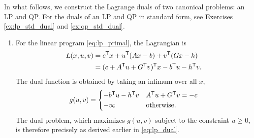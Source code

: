 \begin{Example}
In what follows, we construct the Lagrange duals of two canonical problems: an
LP and QP. For the duals of an LP and QP in standard form, see Exercises
\ref{ex:lp_std_dual} and \ref{ex:qp_std_dual}.           

\begin{enumerate}[label=\alph*., ref=\alph*]  
\item {} 
For the linear program \eqref{eq:lp_primal}, the Lagrangian is
\begin{align*}
L(x,u,v) &= c^{\mathsf{T}} x + u^{\mathsf{T}} (Ax - b) + v^{\mathsf{T}} (Gx - h) \\
&= (c + A^{\mathsf{T}} u + G^{\mathsf{T}} v)^{\mathsf{T}} x - b^{\mathsf{T}} u - h^{\mathsf{T}} v.
\end{align*}
The dual function is obtained by taking an infimum over all $x$,
\[
g(u,v) = \begin{cases}
- b^{\mathsf{T}} u - h^{\mathsf{T}} v & A^{\mathsf{T}} u + G^{\mathsf{T}} v = -c \\
- \infty & \text{otherwise}.
\end{cases}
\]
The dual problem, which maximizes $g(u,v)$ subject to the constraint $u \geq
0$, is therefore precisely as derived earlier in \eqref{eq:lp_dual}. 


\end{enumerate}
\end{Example}
